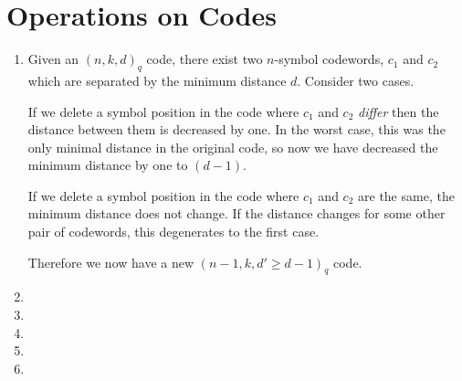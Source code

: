 \documentclass[12pt]{article}
\begin{document}
\newcommand{\ket}[1]{|#1 \rangle}
\newcommand{\normtwo}{\frac{1}{\sqrt{2}}}

\setcounter{section}{0}
\section{Operations on Codes}

\begin{enumerate}

\item
Given an $(n,k,d)_q$ code, there exist two $n$-symbol codewords,
$c_1$ and $c_2$
which are separated by the minimum distance $d$. Consider two cases.

If we delete a symbol position in the code where $c_1$ and $c_2$ \emph{differ}
then the distance between them is decreased by one. In the worst case,
this was the only minimal distance in the original code, so now we have
decreased the minimum distance by one to $(d-1)$.

If we delete a symbol position in the code where $c_1$ and $c_2$ are the same,
the minimum distance does not change. If the distance changes for some other
pair of codewords, this degenerates to the first case.

Therefore we now have a new $(n-1,k,d'\ge d-1)_q$ code.

\item

\item

\item

\item

\item

\end{enumerate}

\pagebreak

\setcounter{section}{1}
\end{document}
